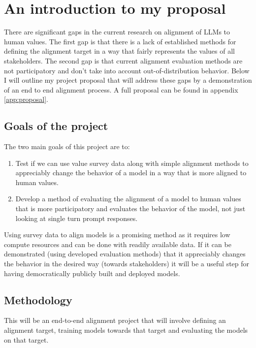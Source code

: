 \section{An introduction to my proposal}
\label{sec:proposal_intro}

There are significant gaps in the current research on alignment of LLMs to human values. The first gap is that there is a lack of established methods for defining the alignment target in a way that fairly represents the values of all stakeholders. The second gap is that current alignment evaluation methods are not participatory and don't take into account out-of-distribution behavior. Below I will outline my project proposal that will address these gaps by a demonstration of an end to end alignment process. A full proposal can be found in appendix \ref{app:proposal}.

\subsection{Goals of the project}

The two main goals of this project are to:
\begin{enumerate}
    \item Test if we can use value survey data along with simple alignment methods to appreciably change the behavior of a model in a way that is more aligned to human values.
    \item Develop a method of evaluating the alignment of a model to human values that is more participatory and evaluates the behavior of the model, not just looking at single turn prompt responses.
\end{enumerate}

Using survey data to align models is a promising method as it requires low compute resources and can be done with readily available data. If it can be demonstrated (using developed evaluation methods) that it appreciably changes the behavior in the desired way (towards stakeholders) it will be a useful step for having democratically publicly built and deployed models.

\subsection{Methodology}

This will be an end-to-end alignment project that will involve defining an alignment target, training models towards that target and evaluating the models on that target.


